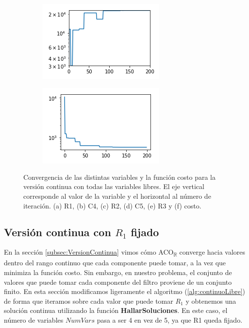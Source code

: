 \documentclass{llncs}
\begin{document}
\begin{figure}[!h]
\begin{subfigure}{0.5\textwidth}
			\caption{}
			\label{fig:F-c5}
		\end{subfigure}   \\                                                         
		\begin{subfigure}{0.5\textwidth}
			\centering
			\includegraphics[scale=0.7]{ContinuoLibre/cc-r3}
			\caption{}
			\label{fig:F-r3}
		\end{subfigure}%
		\begin{subfigure}{0.5\textwidth}
			\centering
			\includegraphics[scale=0.7]{ContinuoLibre/cc-costo}
			\caption{}
			\label{fig:F-costo}
		\end{subfigure}                                                            
		\caption{Convergencia de las distintas variables y la función costo para la versión continua con todas las variables libres. El eje vertical 
			corresponde al valor de la variable y el horizontal al número de iteración. (a) R1, (b) C4, (c) R2, (d) 
			C5, (e) R3 y (f) costo. }                                                                                  
		\label{fig:FF}                                                                                  
	\end{figure}
	
	\subsection{Versión continua con $R_1$ fijado}
	\label{subsec:VersionContinuaR1Fijado}
	En la sección \ref{subsec:VersionContinua} vimos cómo ACO\textsubscript{$\mathbb{R}$} converge hacia valores dentro 
	del rango continuo que cada componente puede tomar, a la vez que minimiza la función costo. Sin embargo, 
	en nuestro problema, el conjunto de valores que puede tomar cada componente del filtro proviene de un conjunto finito. 
	En esta sección modificamos ligeramente el algoritmo (\ref{alg:continuoLibre}) de forma que iteramos sobre cada valor 
	que puede tomar $R_1$ y obtenemos una solución continua utilizando la función \textbf{HallarSoluciones}. 
	En este caso, el número de variables $NumVars$ pasa a ser  4 en vez de 5, ya que R1 queda fijado.
	
\end{document}
